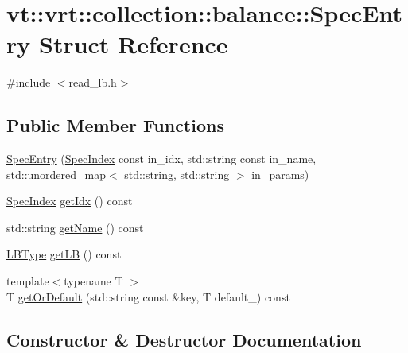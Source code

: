 \hypertarget{structvt_1_1vrt_1_1collection_1_1balance_1_1_spec_entry}{}\section{vt\+:\+:vrt\+:\+:collection\+:\+:balance\+:\+:Spec\+Entry Struct Reference}
\label{structvt_1_1vrt_1_1collection_1_1balance_1_1_spec_entry}


{\ttfamily \#include $<$read\+\_\+lb.\+h$>$}

\subsection*{Public Member Functions}
\begin{DoxyCompactItemize}
\item 
\hyperlink{structvt_1_1vrt_1_1collection_1_1balance_1_1_spec_entry_a69de4799079a46b5af62eccf974b7eef}{Spec\+Entry} (\hyperlink{namespacevt_1_1vrt_1_1collection_1_1balance_a72a5e0d9936ddf57f8e6c64e0e9fd123}{Spec\+Index} const in\+\_\+idx, std\+::string const in\+\_\+name, std\+::unordered\+\_\+map$<$ std\+::string, std\+::string $>$ in\+\_\+params)
\item 
\hyperlink{namespacevt_1_1vrt_1_1collection_1_1balance_a72a5e0d9936ddf57f8e6c64e0e9fd123}{Spec\+Index} \hyperlink{structvt_1_1vrt_1_1collection_1_1balance_1_1_spec_entry_a665d82dc37723e5392d215973eb1e73b}{get\+Idx} () const
\item 
std\+::string \hyperlink{structvt_1_1vrt_1_1collection_1_1balance_1_1_spec_entry_a1a6b18669456c0d4c9c311c63fd912c8}{get\+Name} () const
\item 
\hyperlink{namespacevt_1_1vrt_1_1collection_1_1balance_ac4f99693509affcc67db182d4aad9b5c}{L\+B\+Type} \hyperlink{structvt_1_1vrt_1_1collection_1_1balance_1_1_spec_entry_a265df7d1bc8ac20e92c7799fd4973018}{get\+LB} () const
\item 
{\footnotesize template$<$typename T $>$ }\\T \hyperlink{structvt_1_1vrt_1_1collection_1_1balance_1_1_spec_entry_ae5c35506e15c2123029d071a284b9367}{get\+Or\+Default} (std\+::string const \&key, T default\+\_\+) const
\end{DoxyCompactItemize}


\subsection{Constructor \& Destructor Documentation}
\mbox{\label{structvt_1_1vrt_1_1collection_1_1balance_1_1_spec_entry_a69de4799079a46b5af62eccf974b7eef}} 
